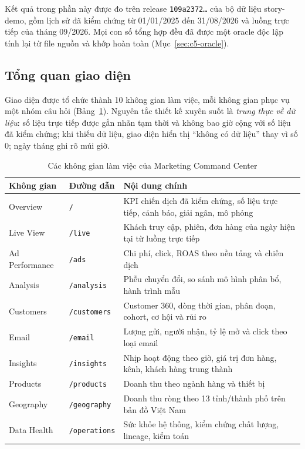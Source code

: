 Kết quả trong phần này được đo trên release \texttt{109a2372\ldots} của bộ dữ liệu story-demo, gồm lịch sử đã kiểm chứng từ 01/01/2025 đến 31/08/2026 và luồng trực tiếp của tháng 09/2026. Mọi con số tổng hợp đều đã được một oracle độc lập tính lại từ file nguồn và khớp hoàn toàn (Mục~\ref{sec:c5-oracle}).

\subsection{Tổng quan giao diện}
\label{sec:c4-tong-quan-ui}
Giao diện được tổ chức thành 10 không gian làm việc, mỗi không gian phục vụ một nhóm câu hỏi (Bảng~\ref{tab:workspaces}). Nguyên tắc thiết kế xuyên suốt là \emph{trung thực về dữ liệu}: số liệu trực tiếp được gắn nhãn tạm thời và không bao giờ cộng với số liệu đã kiểm chứng; khi thiếu dữ liệu, giao diện hiển thị ``không có dữ liệu'' thay vì số 0; ngày tháng ghi rõ múi giờ.

\begin{table}[H]
\centering
\caption{Các không gian làm việc của Marketing Command Center}
\label{tab:workspaces}
\small
\renewcommand{\arraystretch}{1.2}
\begin{tabularx}{\textwidth}{>{\raggedright\arraybackslash}p{3.0cm} >{\raggedright\arraybackslash}p{2.2cm} >{\raggedright\arraybackslash}X}
\toprule
\textbf{Không gian} & \textbf{Đường dẫn} & \textbf{Nội dung chính} \\
\midrule
Overview & \texttt{/} & KPI chiến dịch đã kiểm chứng, số liệu trực tiếp, cảnh báo, giải ngân, mô phỏng \\
Live View & \texttt{/live} & Khách truy cập, phiên, đơn hàng của ngày hiện tại từ luồng trực tiếp \\
Ad Performance & \texttt{/ads} & Chi phí, click, ROAS theo nền tảng và chiến dịch \\
Analysis & \texttt{/analysis} & Phễu chuyển đổi, so sánh mô hình phân bổ, hành trình mẫu \\
Customers & \texttt{/customers} & Customer 360, dòng thời gian, phân đoạn, cohort, cơ hội và rủi ro \\
Email & \texttt{/email} & Lượng gửi, người nhận, tỷ lệ mở và click theo loại email \\
Insights & \texttt{/insights} & Nhịp hoạt động theo giờ, giá trị đơn hàng, kênh, khách hàng trung thành \\
Products & \texttt{/products} & Doanh thu theo ngành hàng và thiết bị \\
Geography & \texttt{/geography} & Doanh thu ròng theo 13 tỉnh/thành phố trên bản đồ Việt Nam \\
Data Health & \texttt{/operations} & Sức khỏe hệ thống, kiểm chứng chất lượng, lineage, kiểm toán \\
\bottomrule
\end{tabularx}
\end{table}

